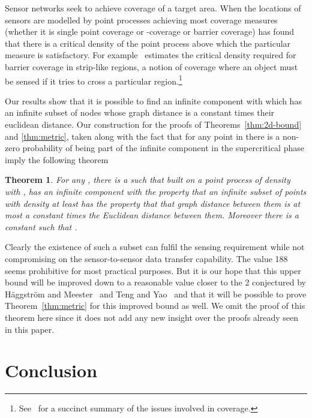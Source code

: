 \documentclass[11pt]{article}
\newtheorem{theorem}{Theorem}[section]
\begin{document}
Sensor networks seek to achieve coverage of a target area. When the
locations of sensors are modelled by point processes achieving most
coverage measures (whether it is single point coverage or -coverage
or barrier coverage) has found that there is a critical density of the
point process above which the particular measure is satisfactory. For
example~\cite{ballister-mobicom:2007} estimates the critical density
required for barrier coverage in strip-like regions, a notion of
coverage where an object must be sensed if it tries to cross a
particular region.\footnote{See~\cite[Chap 13.2]{karl:2005} for a
succinct summary of the issues involved in coverage.}

Our results show that it is possible to find an infinite component
with which has an infinite subset of nodes whose graph distance is a
constant times their euclidean distance. Our construction for the
proofs of Theorems~\ref{thm:2d-bound} and \ref{thm:metric}, taken
along with the fact that for any point in  there is a non-zero
probability of being part of the infinite component in the
supercritical phase imply the following theorem

\begin{theorem}
\label{thm:sensor-coverage}
For any , there is a  such that  built on
a point process of density  with , has an infinite
component with the property that an infinite subset of points with
density at least  has the property that that graph distance
between them is at most a constant times the Euclidean distance
between them. Moreover there is a constant  such that . 
\end{theorem}

Clearly the existence of such a subset can fulfil the sensing
requirement while not compromising on the sensor-to-sensor data
transfer capability.  The value 188 seems prohibitive for most
practical purposes. But it is our hope that this upper bound will be
improved down to a reasonable value closer to the 2 conjectured by
H\"aggstr\"om and Meester~\cite{haggstrom-rsa:1996} and Teng and
Yao~\cite{teng-algorithmica:2007} and that it will be possible to
prove Theorem~\ref{thm:metric} for this improved bound as well. We
omit the proof of this theorem here since it does not add any new
insight over the proofs already seen in this paper.






\section{Conclusion}
\label{sec:conclusion}
\end{document}
